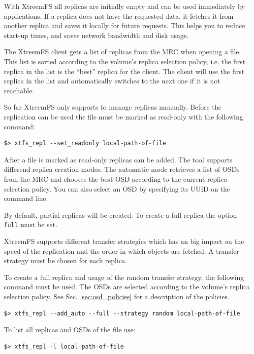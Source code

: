 \documentclass[a4paper,10pt]{book}
\begin{document}
With XtreemFS all replicas are initially empty and can be used immediately by applications. If a replica does not have the requested data, it fetches it from another replica and saves it locally for future requests. This helps you to reduce start-up times, and saves network bandwidth and disk usage.

The XtreemFS client gets a list of replicas from the MRC when opening a file. This list is sorted according to the volume's replica selection policy, i.e. the first replica in the list is the ``best'' replica for the client. The client will use the first replica in the list and automatically switches to the next one if it is not reachable.

So far XtreemFS only supports to manage replicas manually. Before the replication can be used the file must be marked as read-only with the following command:

\begin{verbatim}
$> xtfs_repl --set_readonly local-path-of-file
\end{verbatim}

After a file is marked as read-only replicas can be added. The tool supports differend replica creation modes. The automatic mode retrieves a list of OSDs from the MRC and chooses the best OSD according to the current replica selection policy. You can also select an OSD by specifying its UUID on the command line.

By default, partial replicas will be created. To create a full replica the option \texttt{--full} must be set.

XtreemFS supports different transfer strategies which has an big impact on the speed of the replication and the order in which objects are fetched. A transfer strategy must be chosen for each replica.

To create a full replica and usage of the random transfer strategy, the following command must be used. The OSDs are selected according to the volume's replica selection policy. See Sec. \ref{sec:osd_policies} for a description of the policies.

\begin{verbatim}
$> xtfs_repl --add_auto --full --strategy random local-path-of-file
\end{verbatim}

To list all replicas and OSDs of the file use:

\begin{verbatim}
$> xtfs_repl -l local-path-of-file
\end{verbatim}
\end{document}
